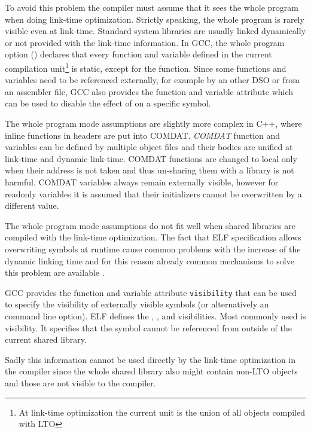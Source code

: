 \documentclass[final]{ols}
\begin{document}
To avoid this problem the compiler must assume that it sees the whole program when doing
link-time optimization.  Strictly speaking, the whole program is rarely visible
even at link-time. Standard system libraries are usually linked
dynamically or not provided with the link-time information.  In GCC, the whole
program option ()  declares that every function and
variable defined in the current compilation unit\footnote{At link-time optimization the current unit
is the union of all objects compiled with LTO} is static, except for the
 function.  Since some functions and variables need to be referenced
externally, for example by an other DSO or from an assembler file, GCC also
provides the function and variable attribute  which can be
used to disable the effect of  on a specific symbol.

The whole program mode assumptions are slightly more complex in C++, where inline
functions in headers are put into COMDAT. {\em COMDAT} function and variables
can be defined by multiple object files and their bodies are unified at
link-time and dynamic link-time. COMDAT functions are changed to local only
when their address is not taken and thus un-sharing them with a library is not
harmful. COMDAT variables always remain externally visible, however for
readonly variables it is assumed that their initializers cannot be overwritten
by a different value.

The whole program mode assumptions do not fit well when shared
libraries are compiled with the link-time optimization.  The fact that ELF specification
allows overwriting symbols at runtime cause common problems with the increase of the dynamic
linking time and for this reason already common mechanisms to solve this
problem are available \cite{UrlichDSO}.

GCC provides the function and variable attribute {\tt visibility} that can be used to specify
the visibility of externally visible symbols (or alternatively an 
command line option).  ELF defines the , ,
 and  visibilities.  Most commonly used is
 visibility. It specifies that the symbol cannot be referenced from outside
of the current shared library. 

Sadly this information cannot be used directly by the link-time optimization in
the compiler since the whole shared library also might contain non-LTO objects
and those are not visible to the compiler. 
\end{document}

